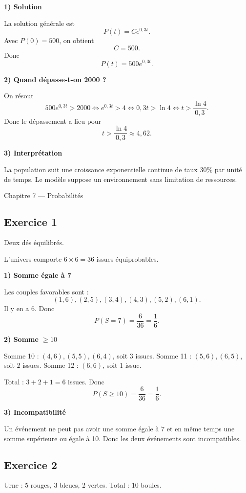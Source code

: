 \documentclass[11pt,a4paper]{article}
\begin{document}
\textbf{1) Solution}

La solution générale est
\[
P(t)=Ce^{0{,}3t}.
\]
Avec \(P(0)=500\), on obtient
\[
C=500.
\]
Donc
\[
\boxed{P(t)=500e^{0{,}3t}.}
\]

\textbf{2) Quand dépasse-t-on 2000 ?}

On résout
\[
500e^{0{,}3t}>2000
\iff e^{0{,}3t}>4
\iff 0{,}3t>\ln 4
\iff t>\frac{\ln 4}{0{,}3}.
\]
Donc le dépassement a lieu pour
\[
\boxed{t>\dfrac{\ln 4}{0{,}3}\approx 4{,}62.}
\]

\textbf{3) Interprétation}

La population suit une croissance exponentielle continue de taux \(30\%\) par unité de temps.  
Le modèle suppose un environnement sans limitation de ressources.

\begin{chapitrebox}{Chapitre 7 --- Probabilités}
\end{chapitrebox}

\subsection*{Exercice 1}
Deux dés équilibrés.

L'univers comporte \(6\times 6=36\) issues équiprobables.

\textbf{1) Somme égale à 7}

Les couples favorables sont :
\[
(1,6),(2,5),(3,4),(4,3),(5,2),(6,1).
\]
Il y en a \(6\). Donc
\[
P(S=7)=\frac{6}{36}=\frac16.
\]

\textbf{2) Somme \(\geq 10\)}

Somme 10 : \((4,6),(5,5),(6,4)\), soit 3 issues.  
Somme 11 : \((5,6),(6,5)\), soit 2 issues.  
Somme 12 : \((6,6)\), soit 1 issue.

Total : \(3+2+1=6\) issues. Donc
\[
P(S\geq 10)=\frac{6}{36}=\frac16.
\]

\textbf{3) Incompatibilité}

Un événement ne peut pas avoir une somme égale à 7 et en même temps une somme supérieure ou égale à 10.  
Donc les deux événements sont incompatibles.

\subsection*{Exercice 2}
Urne : 5 rouges, 3 bleues, 2 vertes. Total : 10 boules.
\end{document}
